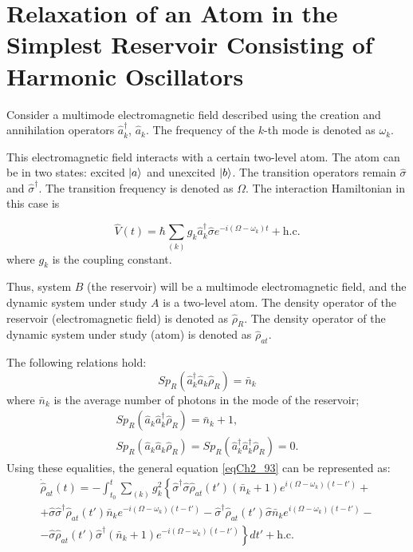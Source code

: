 \section{Relaxation of an Atom in the Simplest Reservoir Consisting of Harmonic Oscillators}
Consider a multimode electromagnetic field described using the creation and annihilation operators $\hat{a}_k^{\dag}$, $\hat{a}_k$. The frequency of the $k$-th mode is denoted as $\omega_k$.

This electromagnetic field interacts with a certain two-level atom. The atom can be in two states: excited $\ket{a}$ and unexcited $\ket{b}$. The transition operators remain $\hat{\sigma}$ and $\hat{\sigma}^{\dag}$. The transition frequency is denoted as  $\Omega$. The interaction Hamiltonian in this case is 

\begin{equation}
\hat{V}\left(t\right) = \hbar
\sum_{(k)} g_k \hat{a}_k^{\dag} \hat{\sigma}e^{-i \left(
\Omega - \omega_k
\right) t} +
\mbox{h.c.}
\label{eqCh2_94}
\end{equation}
where $g_k$ is the coupling constant.

Thus, system $B$ (the reservoir) will be a multimode electromagnetic field, and the dynamic system under study $A$ is a two-level atom. The density operator of the reservoir (electromagnetic field) is denoted as $\hat{\rho}_R$. The density operator of the dynamic system under study (atom) is denoted as $\hat{\rho}_{at}$.

The following relations hold:
\begin{equation}
Sp_R\left(
\hat{a}_k^{\dag}
\hat{a}_k
\hat{\rho}_R
\right) = \bar{n}_k
\label{eqCh2_96}
\end{equation}
where $\bar{n}_k$ is the average number of photons in the mode of the reservoir; 
\begin{eqnarray}
Sp_R\left(\hat{a}_k\hat{a}_k^{\dag}\hat{\rho}_R\right) = \bar{n}_k + 1,
\nonumber \\
Sp_R\left(\hat{a}_k\hat{a}_k\hat{\rho}_R\right) = 
Sp_R\left(\hat{a}_k^{\dag}\hat{a}_k^{\dag}\hat{\rho}_R\right) = 0.
\label{eqCh2_96_add}
\end{eqnarray}
Using these equalities, the general equation \eqref{eqCh2_93} can be represented as:
\begin{eqnarray}
\dot{\hat{\rho}}_{at}\left(t\right) = 
- \int_{t_0}^t\sum_{(k)}g_k^2
\left\{
\hat{\sigma}^{\dag} \hat{\sigma}\hat{\rho}_{at}\left(t'\right)
\left(
\bar{n}_k + 1
\right)
e^{i\left(\Omega - \omega_k\right)
\left(t - t'\right)}
+
\right.
\nonumber \\
\left.
+\hat{\sigma}\hat{\sigma}^{\dag}
\hat{\rho}_{at}\left(t'\right)
\bar{n}_k
e^{-i\left(\Omega - \omega_k\right)
\left(t - t'\right)} -
\hat{\sigma}^{\dag}
\hat{\rho}_{at}\left(t'\right)
\hat{\sigma}
\bar{n}_k
e^{i\left(\Omega - \omega_k\right)
\left(t - t'\right)}
-
\right.
\nonumber \\
-
\left.
\hat{\sigma}
\hat{\rho}_{at}\left(t'\right)
\hat{\sigma}^{\dag}
\left(\bar{n}_k + 1\right)
e^{-i\left(\Omega - \omega_k\right)
\left(t - t'\right)}
\right\}dt'
+ \mbox{h.c.}
\label{eqCh2_97}
\end{eqnarray}

